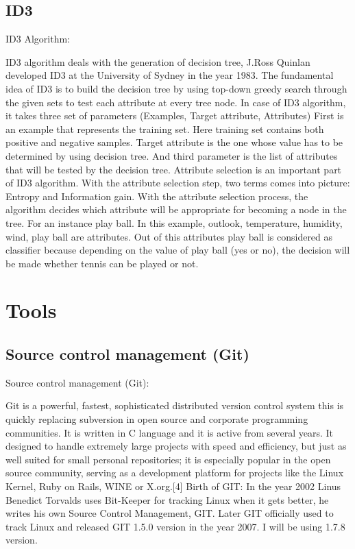 \documentclass{article}
\begin{document}
\subsection{ID3}
\label{sec:ID3}

ID3 Algorithm:

ID3 algorithm deals with the generation of decision tree, J.Ross Quinlan developed ID3 at the University of Sydney in the year 1983. The fundamental idea of ID3 is to build the decision tree by using top-down greedy search through the given sets to test each attribute at every tree node.
In case of ID3 algorithm, it takes three set of parameters
(Examples, Target attribute, Attributes)
First is an example that represents the training set. Here training set contains both positive and negative samples. Target attribute is the one whose value has to be determined by using decision tree. And third parameter is the list of attributes that will be tested by the decision tree. Attribute selection is an important part of ID3 algorithm. With the attribute selection step, two terms comes into picture: Entropy and Information gain. With the attribute selection process, the algorithm decides which attribute will be appropriate for becoming a node in the tree.
For an instance play ball. In this example, outlook, temperature, humidity, wind, play ball are attributes. Out of this attributes play ball is considered as classifier because depending on the value of play ball (yes or no), the decision will be made whether tennis can be played or not.


\section{Tools}
\label{sec:Tools}

\subsection{Source control management (Git)}
\label{sec:scm}

Source control management (Git):

Git is a powerful, fastest, sophisticated distributed version control system this is quickly replacing subversion in open source and corporate programming communities. It is written in C language and it is active from several years. It designed to handle extremely large projects with speed and efficiency,	but just as well suited for small personal repositories; it is especially popular in the open source community, serving as a development platform for projects like the Linux Kernel, Ruby on Rails, WINE or X.org.[4]
Birth of GIT:
In the year 2002 Linus Benedict Torvalds uses Bit-Keeper for tracking Linux when it gets better, he writes his own Source Control Management, GIT. Later GIT officially used to track Linux and released GIT 1.5.0 version in the year 2007.
I will be using 1.7.8 version.
\end{document}
